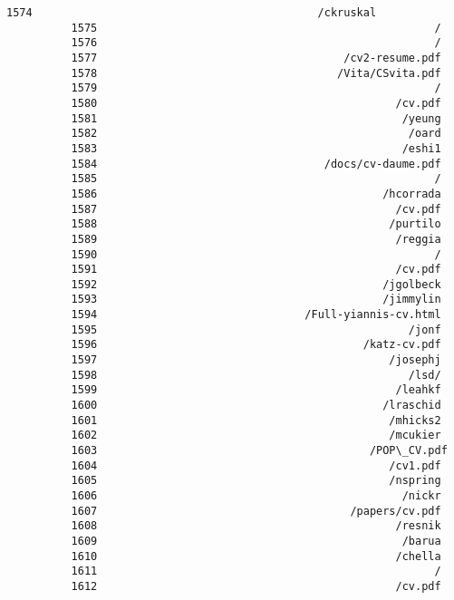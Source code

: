 \documentclass[11pt]{article}
\begin{document}
\begin{Verbatim}[commandchars=\\\{\}]
          1574                                            /ckruskal
          1575                                                    /
          1576                                                    /
          1577                                      /cv2-resume.pdf
          1578                                     /Vita/CSvita.pdf
          1579                                                    /
          1580                                              /cv.pdf
          1581                                               /yeung
          1582                                                /oard
          1583                                               /eshi1
          1584                                   /docs/cv-daume.pdf
          1585                                                    /
          1586                                            /hcorrada
          1587                                              /cv.pdf
          1588                                             /purtilo
          1589                                              /reggia
          1590                                                    /
          1591                                              /cv.pdf
          1592                                            /jgolbeck
          1593                                            /jimmylin
          1594                                /Full-yiannis-cv.html
          1595                                                /jonf
          1596                                         /katz-cv.pdf
          1597                                             /josephj
          1598                                                /lsd/
          1599                                              /leahkf
          1600                                            /lraschid
          1601                                             /mhicks2
          1602                                             /mcukier
          1603                                          /POP\_CV.pdf
          1604                                             /cv1.pdf
          1605                                             /nspring
          1606                                               /nickr
          1607                                       /papers/cv.pdf
          1608                                              /resnik
          1609                                               /barua
          1610                                              /chella
          1611                                                    /
          1612                                              /cv.pdf

\end{Verbatim}
\end{document}
